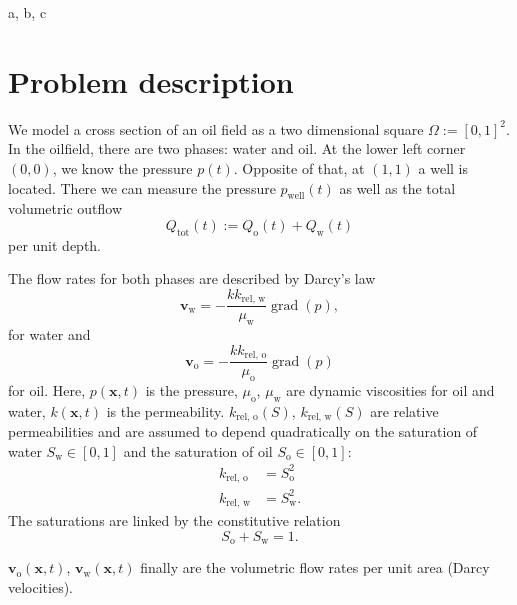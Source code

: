 \documentclass[conference]{IEEEtran}
\DeclareMathOperator*{\grad}{grad}
\renewcommand*{\vec}[1]{\ensuremath{{\bm{#1}}}}
\begin{document}
\begin{IEEEkeywords}
a, b, c
\end{IEEEkeywords}

\section{Problem description}
We model a cross section of an oil field as a two dimensional square $\Omega := [0, 1]^2.$ In the oilfield, there are two phases: water and oil. 
At the lower left corner $(0, 0)$, we know the pressure $p(t)$. Opposite of that, at $(1, 1)$ a well is located.
There we can measure the pressure $p_\text{well}(t)$ as well as the total volumetric outflow \[{Q}_\text{tot}(t) := {Q}_\text{o}(t) + {Q}_\text{w}(t)\] per unit depth.

The flow rates for both phases are described by Darcy's law
\begin{equation}
\label{flowrateWater}
\vec{v}_\text{w} = -\frac{k k_\text{rel, w}}{\mu_\text{w}} \grad(p),
\end{equation}
for water and
\begin{equation}
\label{flowrateOil}
\vec{v}_\text{o} = -\frac{k k_\text{rel, o}}{\mu_\text{o}} \grad(p)
\end{equation}
for oil.
Here, $p(\vec{x}, t)$ is the pressure, $\mu_\text{o}$, $\mu_\text{w}$ are dynamic viscosities for oil and water, $k(\vec{x}, t)$ is the permeability.
$k_\text{rel, o}(S)$, $k_\text{rel, w}(S)$ are relative permeabilities and are assumed to depend quadratically on the saturation of water $S_\text{w} \in [0, 1]$ and the saturation of oil $S_\text{o} \in [0, 1]$:
\begin{align}
\label{relativePermeabilityModel}
k_\text{rel, o} &= S_\text{o}^2\\
k_\text{rel, w} &= S_\text{w}^2.
\end{align}
The saturations are linked by the constitutive relation
\begin{equation}
S_\text{o} + S_\text{w} = 1.
\end{equation}

$\vec{v}_\text{o}(\vec{x}, t)$, $\vec{v}_\text{w}(\vec{x}, t)$ finally are the volumetric flow rates per unit area (Darcy velocities).
\end{document}
